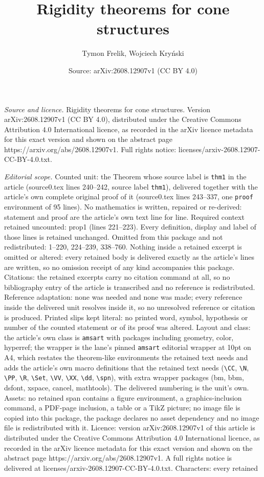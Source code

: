 \documentclass[10pt,a4paper]{amsart}
\title[Rigidity theorems for cone structures]{Rigidity theorems for cone structures}
\author{Tymon Frelik, Wojciech Kry\'nski}
\date{Source: arXiv:2608.12907v1 (CC BY 4.0)}
\begin{document}
\maketitle

\noindent\emph{Source and licence.} Rigidity theorems for cone structures. Version arXiv:2608.12907v1 (CC BY 4.0), distributed under the Creative Commons Attribution 4.0 International licence, as recorded in the arXiv licence metadata for this exact version and shown on the abstract page https://arxiv.org/abs/2608.12907v1. Full rights notice: licenses/arxiv-2608.12907-CC-BY-4.0.txt.\par\smallskip

\noindent\textit{Editorial scope.} Counted unit: the Theorem whose source label is \texttt{thm1} in the article (source0.tex lines 240--242, source label \texttt{thm1}), delivered together with the article's own complete original proof of it (source0.tex lines 243--337, one \texttt{proof} environment of 95 lines). No mathematics is written, repaired or re-derived: statement and proof are the article's own text line for line. Required context retained uncounted: prop1 (lines 221--223). Every definition, display and label of those lines is retained unchanged. Omitted from this package and not redistributed: 1--220, 224--239, 338--760. Nothing inside a retained excerpt is omitted or altered: every retained body is delivered exactly as the article's lines are written, so no omission receipt of any kind accompanies this package. Citations: the retained excerpts carry no citation command at all, so no bibliography entry of the article is transcribed and no reference is redistributed. Reference adaptation: none was needed and none was made; every reference inside the delivered unit resolves inside it, so no unresolved reference or citation is produced. Printed slips kept literal: no printed word, symbol, hypothesis or number of the counted statement or of its proof was altered. Layout and class: the article's own class is \texttt{amsart} with packages including geometry, color, hyperref; the wrapper is the lane's pinned \texttt{amsart} editorial wrapper at 10pt on A4, which restates the theorem-like environments the retained text needs and adds the article's own macro definitions that the retained text needs (\texttt{\textbackslash CC}, \texttt{\textbackslash N}, \texttt{\textbackslash PP}, \texttt{\textbackslash R}, \texttt{\textbackslash Set}, \texttt{\textbackslash VV}, \texttt{\textbackslash XX}, \texttt{\textbackslash dd}, \texttt{\textbackslash spn}), with extra wrapper packages (bm, bbm, dsfont, xspace, cancel, mathtools). The delivered numbering is the unit's own. Assets: no retained span contains a figure environment, a graphics-inclusion command, a PDF-page inclusion, a table or a TikZ picture; no image file is copied into this package, the package declares no asset dependency and no image file is redistributed with it. Licence: version arXiv:2608.12907v1 of this article is distributed under the Creative Commons Attribution 4.0 International licence, as recorded in the arXiv licence metadata for this exact version and shown on the abstract page https://arxiv.org/abs/2608.12907v1. A full rights notice is delivered at licenses/arxiv-2608.12907-CC-BY-4.0.txt. Characters: every retained 
\end{document}
